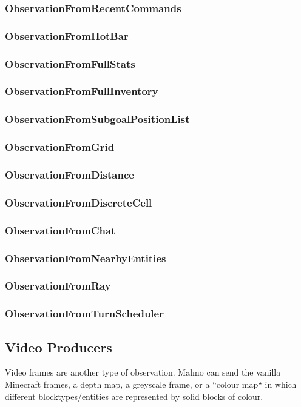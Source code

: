 \documentclass[11pt]{article} %
\begin{document}
\subsubsection{ObservationFromRecentCommands}
\subsubsection{ObservationFromHotBar}
\subsubsection{ObservationFromFullStats}
\subsubsection{ObservationFromFullInventory}
\subsubsection{ObservationFromSubgoalPositionList}
\subsubsection{ObservationFromGrid}
\subsubsection{ObservationFromDistance}
\subsubsection{ObservationFromDiscreteCell}
\subsubsection{ObservationFromChat}
\subsubsection{ObservationFromNearbyEntities}
\subsubsection{ObservationFromRay}
\subsubsection{ObservationFromTurnScheduler}

\subsection{Video Producers}
Video frames are another type of observation. Malmo can send the vanilla Minecraft frames, a depth map, a greyscale frame, or a ``colour map`` in which different blocktypes/entities are represented by solid blocks of colour.
\end{document}
